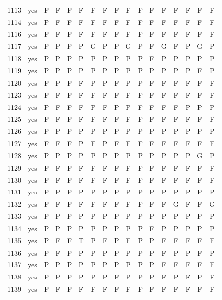 \begin{table}[p]
\begin{tabular*}{\textwidth}{@{\extracolsep{\fill}}rcccccccccccccccc}
1113 & yes & F & F & F & F & F & F & F & F & F & F & F & F & F & F & F\\
1114 & yes & P & F & F & F & F & F & F & F & F & F & F & F & F & F & F\\
1116 & yes & F & F & F & F & F & F & F & F & F & F & F & F & F & F & F\\
1117 & yes & P & P & P & P & G & P & P & G & P & F & G & F & P & G & P\\
1118 & yes & P & P & P & P & P & P & P & P & P & F & P & P & P & P & P\\
1119 & yes & P & P & P & P & P & P & P & P & P & P & P & P & P & F & P\\
1120 & yes & F & P & F & F & P & P & F & P & P & F & F & F & F & F & F\\
1123 & yes & F & F & F & F & F & F & F & F & F & F & F & F & F & F & F\\
1124 & yes & P & F & F & F & P & F & P & P & F & F & F & F & P & P & P\\
1125 & yes & F & F & F & F & F & F & F & F & F & F & F & F & F & F & F\\
1126 & yes & P & P & P & P & P & P & P & P & P & P & P & P & P & P & P\\
1127 & yes & F & F & F & P & F & P & F & F & F & F & F & F & F & F & F\\
1128 & yes & P & P & P & P & P & P & P & P & P & P & P & P & P & G & P\\
1129 & yes & F & F & F & F & F & F & F & F & F & F & F & F & F & F & F\\
1130 & yes & F & F & F & F & F & F & F & F & F & F & F & F & F & F & F\\
1131 & yes & P & P & P & P & P & P & P & P & P & P & P & P & P & P & P\\
1132 & yes & F & F & F & F & F & F & F & F & F & F & F & G & F & F & G\\
1133 & yes & P & P & P & P & P & P & P & P & P & P & P & P & P & P & P\\
1134 & yes & P & P & P & P & P & P & P & P & P & F & P & P & P & P & P\\
1135 & yes & P & F & F & T & P & F & P & F & P & P & F & F & F & F & F\\
1136 & yes & P & F & P & P & P & P & P & P & P & P & F & P & P & F & P\\
1137 & yes & P & P & P & P & P & P & P & P & P & P & F & F & F & F & F\\
1138 & yes & P & P & P & P & P & P & F & P & P & P & F & P & F & P & F\\
1139 & yes & F & F & F & F & F & F & F & F & F & F & F & F & F & F & F\\
\bottomrule\end{tabular*}\end{table}
\clearpage
